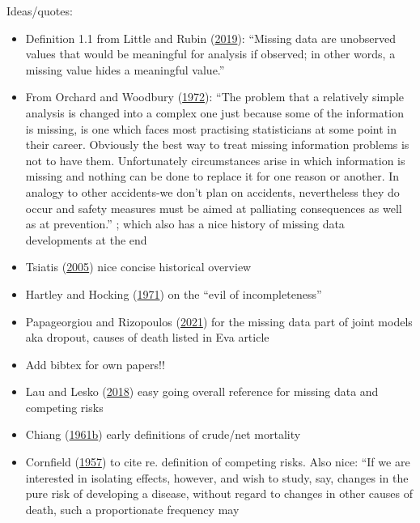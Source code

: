 \documentclass[
  letterpaper,
  DIV=11,
  numbers=noendperiod]{scrreprt}
\begin{document}
Ideas/quotes:

\begin{itemize}
\item
  Definition 1.1 from Little and Rubin
  (\protect\hyperlink{ref-littleStatisticalAnalysisMissing2019}{2019}):
  ``Missing data are unobserved values that would be meaningful for
  analysis if observed; in other words, a missing value hides a
  meaningful value.''
\item
  From Orchard and Woodbury
  (\protect\hyperlink{ref-orchard1972missing}{1972}): ``The problem that
  a relatively simple analysis is changed into a complex one just
  because some of the information is missing, is one which faces most
  practising statisticians at some point in their career. Obviously the
  best way to treat missing information problems is not to have them.
  Unfortunately circumstances arise in which information is missing and
  nothing can be done to replace it for one reason or another. In
  analogy to other accidents-we don't plan on accidents, nevertheless
  they do occur and safety measures must be aimed at palliating
  consequences as well as at prevention.'' ; which also has a nice
  history of missing data developments at the end
\item
  Tsiatis (\protect\hyperlink{ref-tsiatis2005encycl}{2005}) nice concise
  historical overview
\item
  Hartley and Hocking
  (\protect\hyperlink{ref-hartleyAnalysisIncompleteData1971}{1971}) on
  the ``evil of incompleteness''
\item
  Papageorgiou and Rizopoulos
  (\protect\hyperlink{ref-papageorgiouAlternativeCharacterizationMAR2021}{2021})
  for the missing data part of joint models aka dropout, causes of death
  listed in Eva article
\item
  Add bibtex for own papers!!
\item
  Lau and Lesko
  (\protect\hyperlink{ref-lauMissingnessSettingCompeting2018}{2018})
  easy going overall reference for missing data and competing risks
\item
  Chiang (\protect\hyperlink{ref-chiang1961probability}{1961b}) early
  definitions of crude/net mortality
\item
  Cornfield
  (\protect\hyperlink{ref-cornfieldEstimationProbabilityDeveloping1957}{1957})
  to cite re. definition of competing risks. Also nice: ``If we are
  interested in isolating effects, however, and wish to study, say,
  changes in the pure risk of developing a disease, without regard to
  changes in other causes of death, such a proportionate frequency may

\end{itemize}
\end{document}
